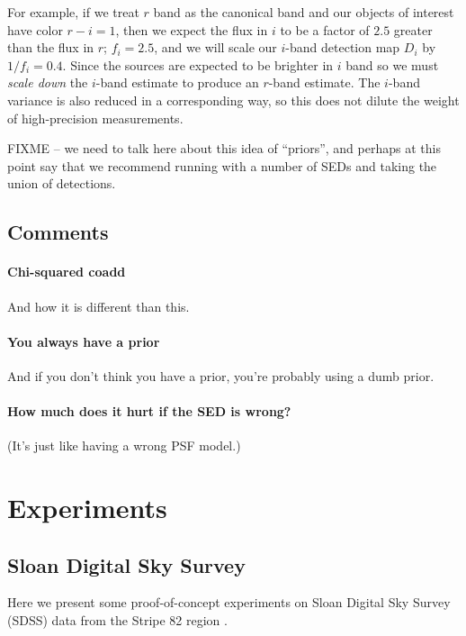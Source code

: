 \documentclass[letterpaper,preprint]{aastex62}
\begin{document}
For example, if we treat $r$ band as the canonical band and our
objects of interest have color $r-i = 1$, then we 
expect the flux in $i$ to be a factor of $2.5$ greater than the
flux in $r$; $f_i = 2.5$, and we
will scale our
$i$-band detection map $D_i$ by $1/f_i = 0.4$.  Since the
sources are expected to be brighter in $i$ band so we must \emph{scale
  down} the $i$-band estimate to produce an $r$-band estimate.  The
$i$-band variance is also reduced in a corresponding way, so this does
not dilute the weight of high-precision measurements.


FIXME -- we need to talk here about this idea of ``priors'', and
perhaps at this point say that we recommend running with a number of
SEDs and taking the union of detections.

\subsection{Comments}

\paragraph{Chi-squared coadd} And how it is different than this.

\paragraph{You always have a prior} And if you don't think you have a prior,
you're probably using a dumb prior.

\paragraph{How much does it hurt if the SED is wrong?} (It's just like having a wrong PSF model.)


\section{Experiments}

\subsection{Sloan Digital Sky Survey}

Here we present some proof-of-concept experiments on Sloan Digital Sky
Survey (SDSS) data from the Stripe 82 region \cite{sdss}.

\end{document}
